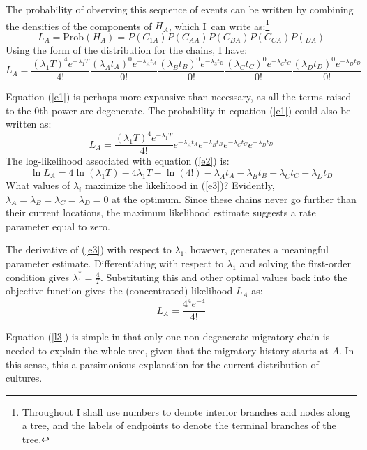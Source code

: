 \documentclass[11pt]{article}
\begin{document}
The probability of observing this sequence of events can be written by combining the densities of the components of  $H_A$, which I\ can write as:\footnote{Throughout I shall use numbers to denote interior branches and nodes along a tree, and the labels of endpoints to denote the terminal branches of the tree.}
\begin{equation*}
L_A=\textrm{Prob}(H_A)=P(C_{1A})P(C_{AA})P(C_{BA})P(C_{CA})P(_{DA})
\end{equation*}
Using the form of the distribution for the chains, I have:
\begin{equation} \label{e1}
L_A = \frac{(\lambda_1 T)^4e^{-\lambda_1T}}{4!}
\frac{(\lambda_A t_A)^0e^{-\lambda_At_A}} {0!}\frac{(\lambda_B t_B)^0e^{-\lambda_3t_B}}{0!}\frac{(\lambda_C t_C)^0e^{-\lambda_Ct_C}}{0!}\frac{(\lambda_D t_D)^0e^{-\lambda_Dt_D}}{0!}
\end{equation} 

Equation (\ref{e1}) is perhaps more expansive than necessary, as all the terms raised to the $0$th power are degenerate. The probability in equation (\ref{e1}) could also be written as:
\begin{equation} \label{e2}
L_A = \frac{(\lambda_1 T)^4e^{-\lambda_1T}}{4!}e^{-\lambda_At_A}e^{-\lambda_Bt_B}e^{-\lambda_Ct_C}e^{-\lambda_Dt_D}
\end{equation} 
The log-likelihood associated with equation (\ref{e2}) is:
\begin{equation} \label{e3}
\ln L_A  = 4\ln(\lambda_1 T) -4\lambda_1T-\ln(4!)-\lambda_At_A-\lambda_Bt_B-\lambda_Ct_C-\lambda_Dt_D
\end{equation} 
What values of $\lambda_i$ maximize the likelihood in (\ref{e3})? Evidently, $\lambda_A=\lambda_B=\lambda_C=\lambda_D=0$ at the optimum. Since these chains never go further than their current locations, the maximum likelihood estimate suggests a rate parameter equal to zero. 

The derivative of (\ref{e3}) with respect to $\lambda_1$, however, generates a meaningful parameter estimate. Differentiating with respect to $\lambda_1$ and solving the first-order condition gives $\lambda_1^*=\frac{4}{T}$. Substituting this and other optimal values back into the objective function gives the (concentrated) likelihood $L_A$ as:
\begin{equation}  \label{l3}
L_A=\frac{4^4e^{-4}}{4!}
\end{equation}

Equation (\ref{l3}) is simple in that only one non-degenerate migratory chain is needed to explain the whole tree, given that the migratory history starts at $A$. In this sense, this a parsimonious explanation for the current distribution of cultures. 
\end{document}
